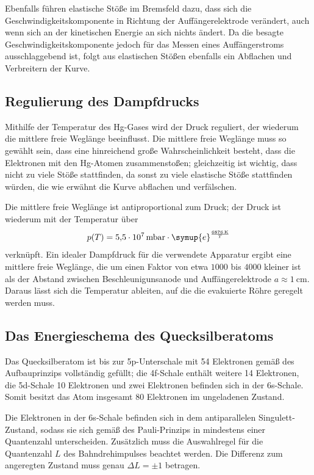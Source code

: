 Ebenfalls führen elastische Stöße im Bremsfeld dazu, dass sich die Geschwindigkeitskomponente in Richtung der Auffängerelektrode
verändert, auch wenn sich an der kinetischen Energie an sich nichts ändert. 
Da die besagte Geschwindigkeitskomponente jedoch für das Messen eines Auffängerstroms ausschlaggebend ist, folgt aus elastischen
Stößen ebenfalls ein Abflachen und Verbreitern der Kurve. 

\subsection{Regulierung des Dampfdrucks}

Mithilfe der Temperatur des Hg-Gases wird der Druck reguliert, der wiederum die mittlere freie Weglänge beeinflusst. 
Die mittlere freie Weglänge muss so gewählt sein, dass eine hinreichend große Wahrscheinlichkeit besteht, dass die Elektronen 
mit den Hg-Atomen zusammenstoßen; gleichzeitig ist wichtig, dass nicht zu viele Stöße stattfinden, da sonst  
zu viele elastische Stöße stattfinden würden, die wie erwähnt die Kurve abflachen und verfälschen. 

Die mittlere freie Weglänge ist antiproportional zum Druck; der Druck ist wiederum mit der Temperatur über 
\begin{equation*}
    p(T)=\SI{5.5e7}{\milli\bar}\cdot \symup{e}^{\frac{\SI{6876}{\kelvin}}{T}}
\end{equation*}
verknüpft. 
Ein idealer Dampfdruck für die verwendete Apparatur ergibt eine mittlere freie Weglänge, die um einen Faktor von etwa 
$1000$ bis $4000$ kleiner ist als der Abstand zwischen Beschleunigunsanode und Auffängerelektrode $a\approx \SI{1}{\centi\meter}$. 
Daraus lässt sich die Temperatur ableiten, auf die die evakuierte Röhre geregelt werden muss. 

\subsection{Das Energieschema des Quecksilberatoms}

Das Quecksilberatom ist bis zur 5p-Unterschale mit 54 Elektronen gemäß des Aufbauprinzips vollständig gefüllt; 
die 4f-Schale enthält weitere 14 Elektronen, die 5d-Schale 10 Elektronen und zwei Elektronen befinden sich in der 6s-Schale. 
Somit besitzt das Atom insgesamt 80 Elektronen im ungeladenen Zustand. 

Die Elektronen in der 6s-Schale befinden sich in dem antiparallelen Singulett-Zustand, sodass sie sich gemäß des Pauli-Prinzips 
in mindestens einer Quantenzahl unterscheiden. 
Zusätzlich muss die Auswahlregel für die Quantenzahl $L$ des Bahndrehimpulses beachtet werden. 
Die Differenz zum angeregten Zustand muss genau $\Delta L=\pm 1$ betragen. 

